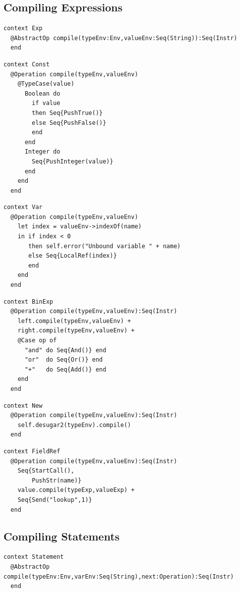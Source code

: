 \documentclass{article}
\begin{document}
\subsection{Compiling Expressions}

\begin{verbatim}
context Exp
  @AbstractOp compile(typeEnv:Env,valueEnv:Seq(String)):Seq(Instr)
  end
\end{verbatim}

\begin{verbatim}
context Const
  @Operation compile(typeEnv,valueEnv)
    @TypeCase(value)
      Boolean do 
        if value 
        then Seq{PushTrue()} 
        else Seq{PushFalse()} 
        end 
      end
      Integer do 
        Seq{PushInteger(value)}
      end
    end
  end
\end{verbatim}

\begin{verbatim}
context Var
  @Operation compile(typeEnv,valueEnv)
    let index = valueEnv->indexOf(name)
    in if index < 0
       then self.error("Unbound variable " + name)
       else Seq{LocalRef(index)}
       end
    end
  end
\end{verbatim}

\begin{verbatim}
context BinExp
  @Operation compile(typeEnv,valueEnv):Seq(Instr)
    left.compile(typeEnv,valueEnv) + 
    right.compile(typeEnv,valueEnv) +
    @Case op of
      "and" do Seq{And()} end
      "or"  do Seq{Or()} end
      "+"   do Seq{Add()} end
    end
  end
\end{verbatim}

\begin{verbatim}
context New
  @Operation compile(typeEnv,valueEnv):Seq(Instr)
    self.desugar2(typeEnv).compile()
  end
\end{verbatim}

\begin{verbatim}
context FieldRef
  @Operation compile(typeEnv,valueEnv):Seq(Instr)
    Seq{StartCall(),
        PushStr(name)}
    value.compile(typeExp,valueExp) +
    Seq{Send("lookup",1)}
  end
\end{verbatim}
    
\subsection{Compiling Statements}

\begin{verbatim}
context Statement
  @AbstractOp compile(typeEnv:Env,varEnv:Seq(String),next:Operation):Seq(Instr)
  end
\end{verbatim}
\end{document}

